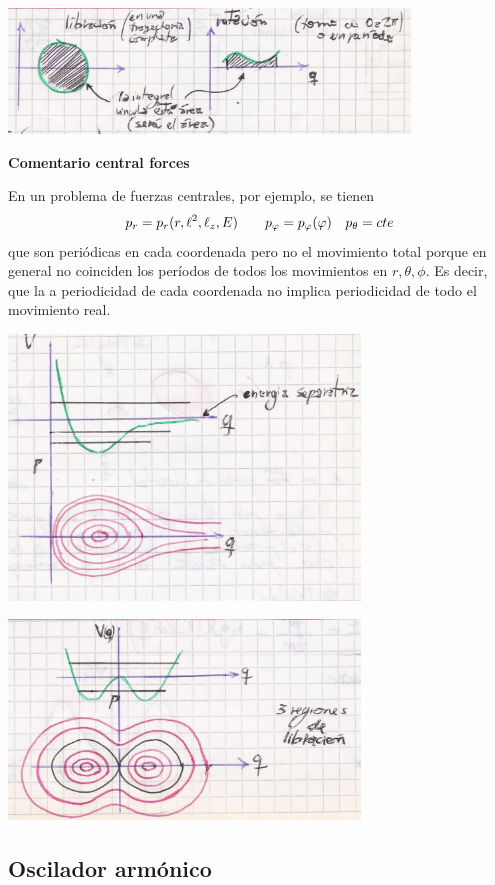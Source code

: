 \documentclass[10pt,oneside]{CBFT_book}
\begin{document}
\includegraphics[width=0.8\textwidth]{images/fig_mc_pendulo_angacc4.jpg}

\begin{ejemplo}{\bf Comentario central forces}

En un problema de fuerzas centrales, por ejemplo, se tienen
\[
	p_r = p_r(r,\ell^2,\ell_z,E) \qquad p_\varphi = p_\varphi(\varphi) \quad p_\theta =cte
\]
que son periódicas en cada coordenada pero no el movimiento total porque en general
no coinciden los períodos de todos los movimientos en $r,\theta,\phi$.
Es decir, que la a periodicidad de cada coordenada no implica periodicidad de todo el movimiento real.

\includegraphics[width=0.7\textwidth]{images/fig_mc_pendulo_angacc5.jpg}

\includegraphics[width=0.7\textwidth]{images/fig_mc_pendulo_angacc6.jpg}

\end{ejemplo}

\subsection{Oscilador armónico}
\end{document}
